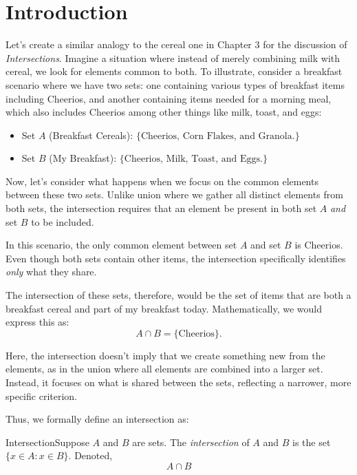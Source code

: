 \renewcommand{\theenumi}{\arabic{enumi}}
\renewcommand{\labelenumi}{\theenumi.}
\section{Introduction}

Let's create a similar analogy to the cereal one in Chapter 3 for the discussion of \textit{Intersections}. Imagine a situation where instead of merely combining milk with cereal, we look for elements common to both. To illustrate, consider a breakfast scenario where we have two sets: one containing various types of breakfast items including Cheerios, and another containing items needed for a morning meal, which also includes Cheerios among other things like milk, toast, and eggs:

\begin{itemize}
    \item Set \(A\) (Breakfast Cereals): \(\{\text{Cheerios, Corn Flakes, and Granola.}\}\)
    \item Set \(B\) (My Breakfast): \(\{\text{Cheerios, Milk, Toast, and Eggs.}\}\)
\end{itemize}

Now, let’s consider what happens when we focus on the common elements between these two sets. Unlike union where we gather all distinct elements from both sets, the intersection requires that an element be present in both set \(A\) \textit{and} set \(B\) to be included.

In this scenario, the only common element between set \(A\) and set \(B\) is Cheerios. Even though both sets contain other items, the intersection specifically identifies \textit{only} what they share.

The intersection of these sets, therefore, would be the set of items that are both a breakfast cereal and part of my breakfast today. Mathematically, we would express this as: \[A \cap B = \{\text{Cheerios}\}.\]

Here, the intersection doesn't imply that we create something new from the elements, as in the union where all elements are combined into a larger set. Instead, it focuses on what is shared between the sets, reflecting a narrower, more specific criterion.

Thus, we formally define an intersection as: 
\begin{definition}
    {Intersection}Suppose \(A\) and \(B\) are sets. The \textit{intersection} of \(A\) and \(B\) is the set \(\{x \in A \colon x \in B\}\). Denoted, \[A\cap B\]
\end{definition}

